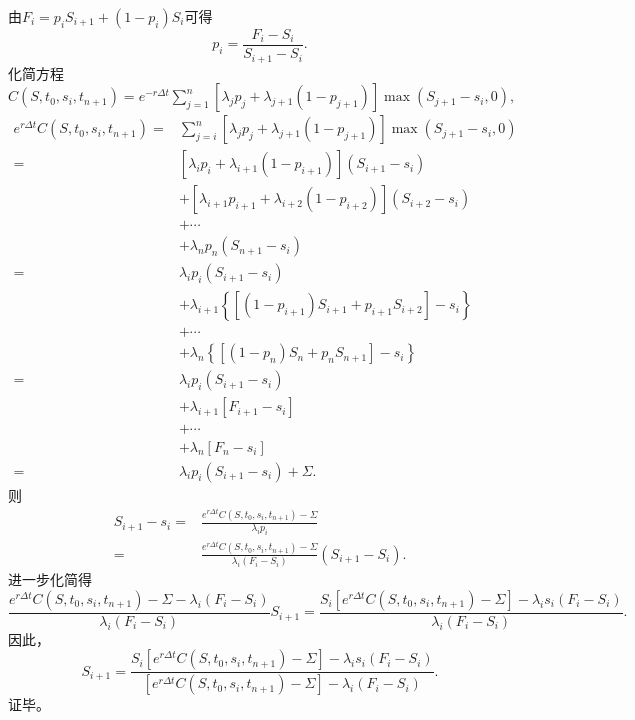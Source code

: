 \begin{Proof}
	由$F_i = p_iS_{i+1}+(1-p_i)S_i$可得
	$$p_i = \frac{F_i-S_i}{S_{i+1}-S_i }.$$
	化简方程$C(S,t_0,s_i,t_{n+1}) = e^{-r \Delta t}\sum_{j=1}^{n} \left[\lambda_jp_j+\lambda_{j+1}(1-p_{j+1})\right]\max(S_{j+1}-s_i,0),$
	\begin{align}
		e^{r\Delta t}C(S,t_0,s_i,t_{n+1}) 
		 = & \sum_{j=i}^{n} \left[\lambda_jp_j+\lambda_{j+1}(1-p_{j+1})\right]\max(S_{j+1}-s_i,0) \nonumber\\
		 = & \left[\lambda_i p_i +\lambda_{i+1}(1-p_{i+1})\right] (S_{i+1}-s_i) \nonumber\\
		     & + \left[\lambda_{i+1} p_{i+1} +\lambda_{i+2}(1-p_{i+2})\right] (S_{i+2}-s_i) \nonumber\\
		     & + \cdots \nonumber\\
		     & + \lambda_n p_n (S_{n+1}-s_i) \nonumber\\
		= & \lambda_i p_i(S_{i+1}-s_i) \nonumber\\
		   & + \lambda_{i+1}\left\{ \left[(1-p_{i+1})S_{i+1}+p_{i+1}S_{i+2}\right]-s_i\right\} \nonumber\\
		   & + \cdots \nonumber\\
		   & + \lambda_n \left\{  \left[(1-p_{n})S_{n}+p_{n}S_{n+1}\right]-s_i\right\} \nonumber\\
		= & \lambda_i p_i(S_{i+1}-s_i) \nonumber\\
		& +  \lambda_{i+1}\left[F_{i+1}-s_i\right]\nonumber\\
		& + \cdots \nonumber\\
		& + \lambda_n \left[F_n-s_i\right]\nonumber \\
		= & \lambda_i p_i(S_{i+1}-s_i)+\Sigma. \nonumber
	\end{align}
	则
	\begin{align}
		S_{i+1}-s_i =& \frac{e^{r\Delta t}C(S,t_0,s_i,t_{n+1}) -\Sigma}{\lambda_i p_i} \nonumber \\
		=& \frac{e^{r\Delta t}C(S,t_0,s_i,t_{n+1}) -\Sigma}{\lambda_i (F_i-S_i)}(S_{i+1}-S_i). \nonumber
	\end{align}
	进一步化简得
	$$\frac{e^{r\Delta t}C(S,t_0,s_i,t_{n+1}) -\Sigma-\lambda_i(F_i-S_i)}{\lambda_i (F_i-S_i)} S_{i+1}
	= \frac{S_i\left[e^{r\Delta t}C(S,t_0,s_i,t_{n+1}) -\Sigma\right]-\lambda_is_i(F_i-S_i)}{\lambda_i (F_i-S_i)}.$$
	因此，
	$$S_{i+1} = \frac{S_i\left[e^{r\Delta t}C(S,t_0,s_i,t_{n+1}) -\Sigma \right]-\lambda_is_i(F_i-S_i)}{\left[e^{r\Delta t}C(S,t_0,s_i,t_{n+1}) -\Sigma \right]-\lambda_i(F_i-S_i)}.$$
	证毕。
\end{Proof}

